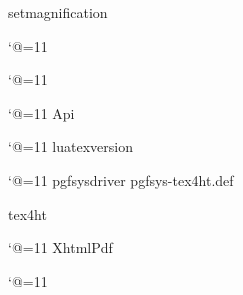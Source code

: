 \ifcsname setmagnification\endcsname
	\magnification\setmagnification\relax
\else
	\relax
\fi








\catcode`@=11\relax



\iftrue



 
 
\fi


\catcode`@=11\relax

\catcode`@=11\relax
%
\newif\ifHtml\Htmlfalse
\ifcsname Api\endcsname
	 \Api
\fi


\catcode`@=11\relax
\ifcsname luatexversion\endcsname
	\def\LD@Engine{luatex}%
\else
	\def\LD@Engine{xetex}%
\fi

\catcode`@=11\relax
\ifcsname pgfsysdriver\endcsname
	\def\LD@Html@Test{pgfsys-tex4ht.def}%
		\def\LD@Output{Xhtml}%
	\ifx\LD@Html@Test\pgfsysdriver
		\Htmltrue
	\fi
\else
	\def\pgfsysdriver{pgfsys-xetex.def}%
	\def\LD@Output{Pdf}%
\fi










\csname tex4ht\endcsname


\catcode`@=11\relax
\def\LD@Output@Test{Xhtml}%
\ifx\LD@Output@Test\LD@Output
	
	
\else
	
\fi

\ifHtml
\else \let\ancientjobname\jobname
\edef\jobname{\ancientjobname-print}
\definecontentsfile{toc}
\edef\indexfilebasename{\ancientjobname-print}
\fi
\def\Tilde{\char`\~}


\let\Q=\left
\let\W=\right
\let\F=\over
\let\b=\big
\let\B=\Big
\def\d{\,\mbox{\rm d}}                                              %


\SecLabelEqtrue             %
\NumReftrue                    %

\catcode `@=11\relax




